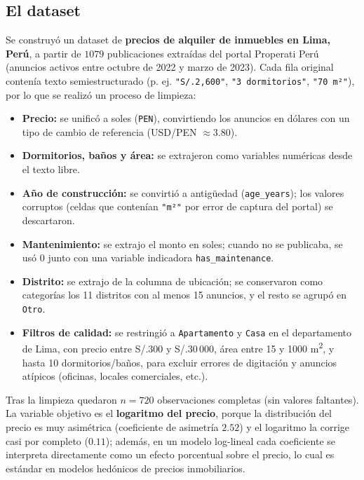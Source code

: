 \documentclass[11pt,a4paper]{article}
\theoremstyle{simple}
\begin{document}
\subsection{El dataset}
Se construyó un dataset de \textbf{precios de alquiler de inmuebles en Lima, Perú}, a partir de $1079$ publicaciones extraídas del portal Properati Perú (anuncios activos entre octubre de 2022 y marzo de 2023). Cada fila original contenía texto semiestructurado (p. ej. \texttt{"S/.2,600"}, \texttt{"3 dormitorios"}, \texttt{"70 m²"}), por lo que se realizó un proceso de limpieza:
\begin{itemize}
\item \textbf{Precio:} se unificó a soles (\texttt{PEN}), convirtiendo los anuncios en dólares con un tipo de cambio de referencia (USD/PEN $\approx 3.80$).
\item \textbf{Dormitorios, baños y área:} se extrajeron como variables numéricas desde el texto libre.
\item \textbf{Año de construcción:} se convirtió a antigüedad (\texttt{age\_years}); los valores corruptos (celdas que contenían \texttt{"m²"} por error de captura del portal) se descartaron.
\item \textbf{Mantenimiento:} se extrajo el monto en soles; cuando no se publicaba, se usó $0$ junto con una variable indicadora \texttt{has\_maintenance}.
\item \textbf{Distrito:} se extrajo de la columna de ubicación; se conservaron como categorías los 11 distritos con al menos 15 anuncios, y el resto se agrupó en \texttt{Otro}.
\item \textbf{Filtros de calidad:} se restringió a \texttt{Apartamento} y \texttt{Casa} en el departamento de Lima, con precio entre S/.300 y S/.30\,000, área entre 15 y 1000 m\textsuperscript{2}, y hasta 10 dormitorios/baños, para excluir errores de digitación y anuncios atípicos (oficinas, locales comerciales, etc.).
\end{itemize}
Tras la limpieza quedaron $n=720$ observaciones completas (sin valores faltantes). La variable objetivo es el \textbf{logaritmo del precio}, porque la distribución del precio es muy asimétrica (coeficiente de asimetría $2.52$) y el logaritmo la corrige casi por completo ($0.11$); además, en un modelo log-lineal cada coeficiente se interpreta directamente como un efecto porcentual sobre el precio, lo cual es estándar en modelos hedónicos de precios inmobiliarios.
\end{document}
